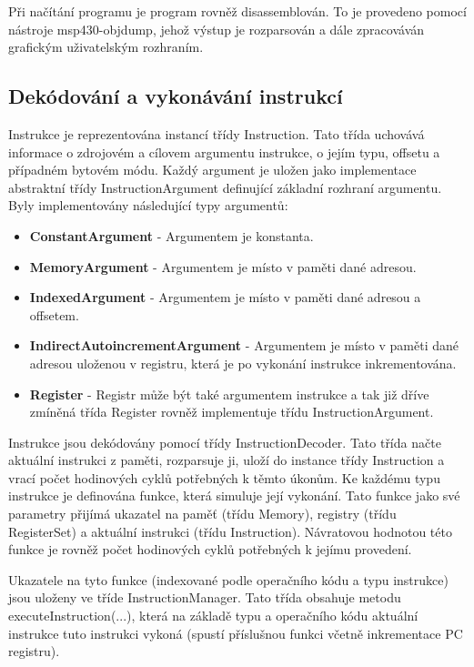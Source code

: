 Při načítání programu je program rovněž disassemblován. To je provedeno pomocí nástroje msp430-objdump, jehož výstup je rozparsován a dále zpracováván grafickým uživatelským rozhraním.

\subsection{Dekódování a vykonávání instrukcí}

Instrukce je reprezentována instancí třídy Instruction. Tato třída uchovává informace o zdrojovém a cílovem argumentu instrukce, o jejím typu, offsetu a případném bytovém módu. Každý argument je uložen jako implementace abstraktní třídy InstructionArgument definující základní rozhraní argumentu. Byly implementovány následující typy argumentů:

\begin{itemize}
\item \textbf{ConstantArgument} - Argumentem je konstanta.
\item \textbf{MemoryArgument} - Argumentem je místo v paměti dané adresou.
\item \textbf{IndexedArgument} - Argumentem je místo v paměti dané adresou a offsetem.
\item \textbf{IndirectAutoincrementArgument} - Argumentem je místo v paměti dané adresou uloženou v registru, která je po vykonání instrukce inkrementována.
\item \textbf{Register} - Registr může být také argumentem instrukce a tak již dříve zmíněná třída Register rovněž implementuje třídu InstructionArgument.
\end{itemize}

Instrukce jsou dekódovány pomocí třídy InstructionDecoder. Tato třída načte aktuální instrukci z paměti, rozparsuje ji, uloží do instance třídy Instruction a vrací počet hodinových cyklů potřebných k těmto úkonům. Ke každému typu instrukce je definována funkce, která simuluje její vykonání. Tato funkce jako své parametry přijímá ukazatel na paměť (třídu Memory), registry (třídu RegisterSet) a aktuální instrukci (třídu Instruction). Návratovou hodnotou této funkce je rovněž počet hodinových cyklů potřebných k jejímu provedení.

Ukazatele na tyto funkce (indexované podle operačního kódu a typu instrukce) jsou uloženy ve tříde InstructionManager. Tato třída obsahuje metodu executeInstruction(...), která na základě typu a operačního kódu aktuální instrukce tuto instrukci vykoná (spustí příslušnou funkci včetně inkrementace PC registru).

